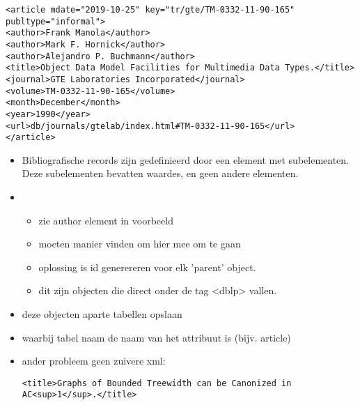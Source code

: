 \lstset{language=XML}
\begin{lstlisting}[caption={DBLP bibliografic record example},label={lst:DblpExample}]
<article mdate="2019-10-25" key="tr/gte/TM-0332-11-90-165" publtype="informal">
<author>Frank Manola</author>
<author>Mark F. Hornick</author>
<author>Alejandro P. Buchmann</author>
<title>Object Data Model Facilities for Multimedia Data Types.</title>
<journal>GTE Laboratories Incorporated</journal>
<volume>TM-0332-11-90-165</volume>
<month>December</month>
<year>1990</year>
<url>db/journals/gtelab/index.html#TM-0332-11-90-165</url>
</article>
\end{lstlisting}
\begin{itemize}
    \item Bibliografische records zijn gedefinieerd door een element met subelementen. Deze subelementen bevatten waardes, en geen andere elementen.
    
    \item 
    \begin{itemize}
        \item zie author element in voorbeeld
        \item moeten manier vinden om hier mee om te gaan
        \item oplossing is id generereren voor elk 'parent' object.
        \item dit zijn objecten die direct onder de tag <dblp> vallen.
    \end{itemize}
   
    
    
    \item deze objecten aparte tabellen opslaan
    \item waarbij tabel naam de naam van het attribuut is (bijv. article)
     \item ander probleem geen zuivere xml: 
    \lstset{language=XML}
    \begin{lstlisting}[caption={XML fout},label={lst:DblpExample2}]
    <title>Graphs of Bounded Treewidth can be Canonized in AC<sup>1</sup>.</title>
    \end{lstlisting}
    
\end{itemize}



